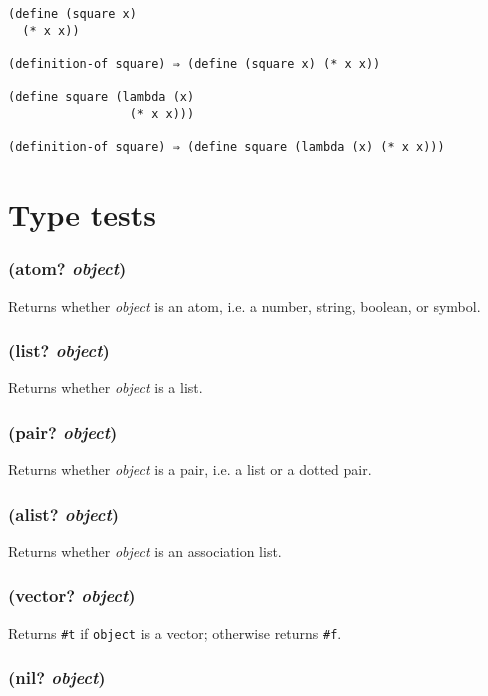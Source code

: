 \documentclass{article}
\begin{document}
\begin{verbatim}
(define (square x)
  (* x x))

(definition-of square) ⇒ (define (square x) (* x x))

(define square (lambda (x)
                 (* x x)))

(definition-of square) ⇒ (define square (lambda (x) (* x x)))
\end{verbatim}

\section{Type tests}\label{sec:type-tests}

\subsubsection{(atom? \emph{object})}

Returns whether \emph{object} is an atom, i.e. a number, string, boolean, or symbol.

\subsubsection{(list? \emph{object})}

Returns whether \emph{object} is a list.

\subsubsection{(pair? \emph{object})}

Returns whether \emph{object} is a pair, i.e. a list or a dotted pair.

\subsubsection{(alist? \emph{object})}

Returns whether \emph{object} is an association list.

\subsubsection{(vector? \emph{object})}

Returns \verb|#t| if \verb|object| is a vector; otherwise returns \verb|#f|.

\subsubsection{(nil? \emph{object})}
\end{document}
